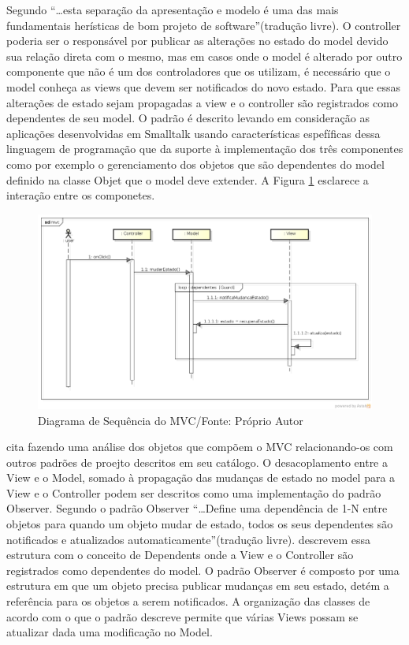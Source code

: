 Segundo  ``\ldots esta separação da
apresentação e modelo é uma das mais fundamentais herísticas de bom projeto
de software''(tradução livre).
O controller poderia ser o responsável por publicar as alterações no estado do
model devido sua relação direta com o mesmo, mas em casos onde o model é
alterado por outro componente que não é um dos controladores que os utilizam, é
necessário que o model conheça as views que devem ser notificados do novo
estado. Para que essas alterações de estado sejam propagadas a view e o
controller são registrados como dependentes de seu model. O padrão é descrito
levando em consideração as aplicações desenvolvidas em Smalltalk usando
características espefíficas dessa linguagem de programação que da suporte à
implementação dos três componentes como por exemplo o gerenciamento dos objetos
que são dependentes do model definido na classe Objet que o model deve extender.
A Figura \ref{mvc_seq} esclarece a interação entre os componetes.

\begin{figure}[h]
	\centering
	\includegraphics[scale=0.5]{img/mvc_seq.png}
	\caption{Diagrama de Sequência do MVC/Fonte: Próprio Autor}
	\label{mvc_seq}
\end{figure}

 cita  fazendo uma análise dos
objetos que compõem o MVC relacionando-os com outros padrões de proejto
descritos em seu catálogo.
O desacoplamento entre a View e o Model, somado à propagação das mudanças de
estado no model para a View e o Controller podem ser
descritos como uma implementação do padrão Observer. Segundo \cite{gof} o padrão
Observer ``\ldots Define uma dependência de 1-N entre objetos para quando um
objeto mudar de estado, todos os seus dependentes são notificados e atualizados
automaticamente''(tradução livre).  descrevem essa
estrutura com o conceito de Dependents onde a View e o Controller são
registrados como dependentes do model. O padrão Observer é composto por uma
estrutura em que um objeto precisa publicar mudanças em seu estado, detém a
referência para os objetos a serem notificados. A organização das classes de
acordo com o que o padrão descreve permite que várias Views possam se atualizar
dada uma modificação no Model.

